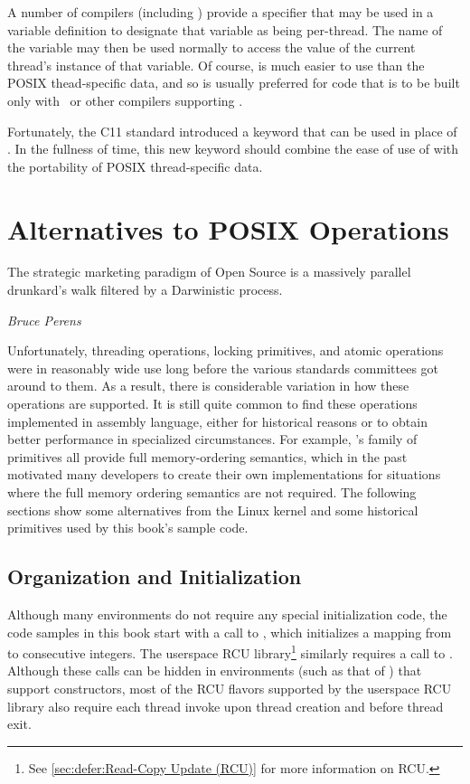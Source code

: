 A number of compilers (including \GCC) provide a  specifier
that may be used in a variable definition to designate that variable
as being per-thread.
The name of the variable may then be used normally to access the
value of the current thread's instance of that variable.
Of course,  is much easier to use than the POSIX
thead-specific data, and so  is usually preferred for
code that is to be built only with \GCC\ or other compilers supporting
.

Fortunately, the C11 standard introduced a  keyword
that can be used in place of .
In the fullness of time, this new keyword should combine the ease of use
of  with the portability of POSIX thread-specific data.

\section{Alternatives to POSIX Operations}
\label{sec:toolsoftrade:Alternatives to POSIX Operations}
%
\epigraph{The strategic marketing paradigm of Open Source is a massively
	  parallel drunkard's walk filtered by a Darwinistic process.}
	 {\emph{Bruce Perens}}

Unfortunately, threading operations, locking primitives, and atomic
operations were in reasonably wide use long before the various standards
committees got around to them.
As a result, there is considerable variation in how these operations
are supported.
It is still quite common to find these operations implemented in
assembly language, either for historical reasons or to obtain better
performance in specialized circumstances.
For example, \GCC's  family of primitives all provide full
memory-ordering semantics, which in the past motivated many developers
to create their own implementations for situations where the full memory
ordering semantics are not required.
The following sections show some alternatives from the Linux kernel
and some historical primitives used by this book's sample code.

\subsection{Organization and Initialization}
\label{sec:toolsoftrade:Organization and Initialization}

Although many environments do not require any special initialization
code, the code samples in this book start with a call to ,
which initializes a mapping from  to consecutive integers.
The userspace RCU library\footnote{
	See \cref{sec:defer:Read-Copy Update (RCU)} for more information
	on RCU\@.}
similarly requires a call to .
Although these calls can be hidden in environments (such as that of
\GCC) that support constructors,
most of the RCU flavors supported by the userspace RCU library
also require each thread invoke  upon thread
creation and  before thread exit.


